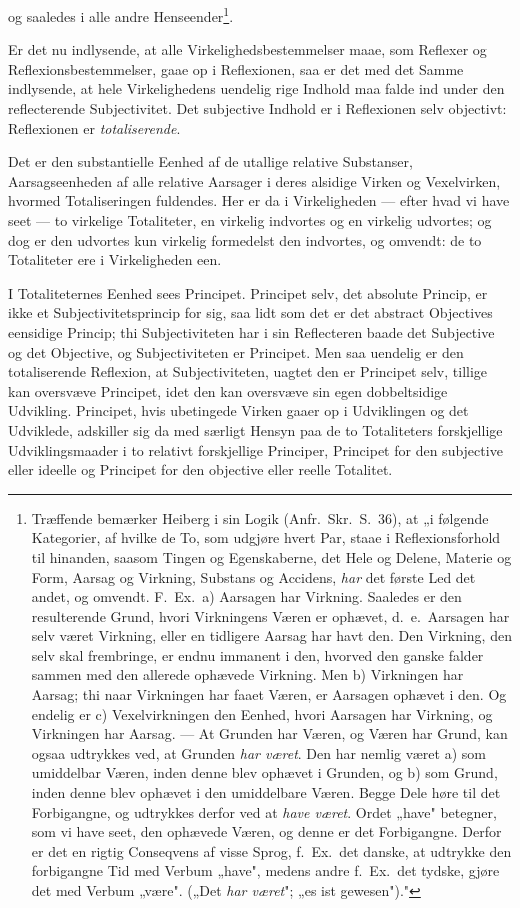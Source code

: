 \documentclass[12pt]{book}
\newcommand{\opage}[1]{\marginnote{\footnotesize\textit{[#1]}}}
\begin{document}
og saaledes i alle andre Henseender\footnote{Træffende bemærker Heiberg i sin Logik
(Anfr.\ Skr.\ S.~36), at „i følgende Kategorier, af hvilke de To, som udgjøre hvert Par,
staae i Reflexionsforhold til hinanden, saasom Tingen og Egenskaberne, det Hele og
Delene, Materie og Form, Aarsag og Virkning, Substans og Accidens, \emph{har} det første
Led det andet, og omvendt. F.\ Ex.\ a) Aarsagen har Virkning. Saaledes er den
resulterende Grund, hvori Virkningens Væren er ophævet, d.\ e.\ Aarsagen har selv været
Virkning, eller en tidligere Aarsag har havt den. Den Virkning, den selv skal frembringe,
er endnu immanent i den, hvorved den ganske falder sammen med den allerede ophævede
Virkning. Men b) Virkningen har Aarsag; thi naar Virkningen har faaet Væren, er Aarsagen
ophævet i den. Og endelig er c) Vexelvirkningen den Eenhed, hvori Aarsagen har Virkning,
og Virkningen har Aarsag. --- At Grunden har Væren, og Væren har Grund, kan ogsaa
udtrykkes ved, at Grunden \emph{har været}. Den har nemlig været a) som umiddelbar Væren,
inden denne blev ophævet i Grunden, og b) som Grund, inden denne blev ophævet i den
umiddelbare Væren. Begge Dele høre til det Forbigangne, og udtrykkes derfor ved at
\emph{have været}. Ordet „have" betegner, som vi have seet, den ophævede Væren, og denne
er det Forbigangne. Derfor er det en rigtig Conseqvens af visse Sprog, f.\ Ex.\ det
danske, at udtrykke den forbigangne Tid med Verbum „have", medens andre f.\ Ex.\ det
tydske, gjøre det med Verbum „være". („Det \emph{har været}"; „es ist gewesen")."}.

\opage{125} Er det nu indlysende, at alle Virkelighedsbestemmelser maae, som Reflexer og
Reflexionsbestemmelser, gaae op i Reflexionen, saa er det med det Samme indlysende, at
hele Virkelighedens uendelig rige Indhold maa falde ind under den reflecterende
Subjectivitet. Det subjective Indhold er i Reflexionen selv objectivt: Reflexionen er
\emph{totaliserende}.

Det er den substantielle Eenhed af de utallige relative Substanser, Aarsagseenheden af
alle relative Aarsager i deres alsidige Virken og Vexelvirken, hvormed Totaliseringen
fuldendes. Her er da i Virkeligheden --- efter hvad vi have seet --- to virkelige
Totaliteter, en virkelig indvortes og en virkelig udvortes; og dog er den udvortes kun
virkelig formedelst den indvortes, og omvendt: de to Totaliteter ere i Virkeligheden een.

I Totaliteternes Eenhed sees Principet. Principet selv, det absolute Princip, er ikke et
Subjectivitetsprincip for sig, saa lidt som det er det abstract Objectives eensidige
Princip; thi Subjectiviteten har i sin Reflecteren baade det Subjective og det Objective,
og Subjectiviteten er Principet. Men saa uendelig er den totaliserende Reflexion, at
\opage{126} Subjectiviteten, uagtet den er Principet selv, tillige kan oversvæve Principet, idet den
kan oversvæve sin egen dobbeltsidige Udvikling. Principet, hvis ubetingede Virken gaaer
op i Udviklingen og det Udviklede, adskiller sig da med særligt Hensyn paa de to
Totaliteters forskjellige Udviklingsmaader i to relativt forskjellige Principer, Principet
for den subjective eller ideelle og Principet for den objective eller reelle Totalitet.
\end{document}
